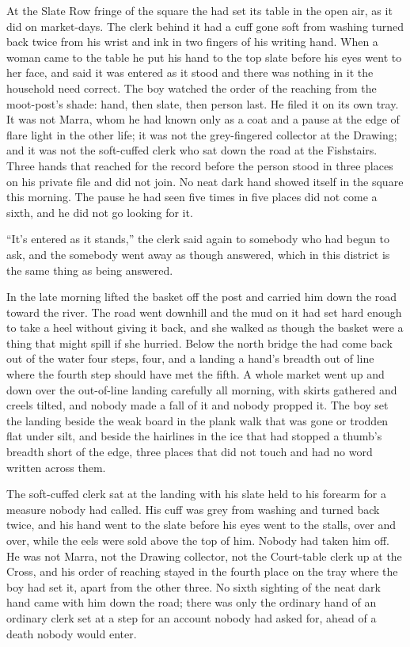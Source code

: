 At the Slate Row fringe of the square the  had set its table in the open air, as it did on market-days. The clerk behind it had a cuff gone soft from washing turned back twice from his wrist and ink in two fingers of his writing hand. When a woman came to the table he put his hand to the top slate before his eyes went to her face, and said it was entered as it stood and there was nothing in it the household need correct. The boy watched the order of the reaching from the moot-post's shade: hand, then slate, then person last. He filed it on its own tray. It was not Marra, whom he had known only as a coat and a pause at the edge of flare light in the other life; it was not the grey-fingered collector at the Drawing; and it was not the soft-cuffed clerk who sat down the road at the Fishstairs. Three hands that reached for the record before the person stood in three places on his private file and did not join. No neat dark hand showed itself in the square this morning. The pause he had seen five times in five places did not come a sixth, and he did not go looking for it.

“It's entered as it stands,” the clerk said again to somebody who had begun to ask, and the somebody went away as though answered, which in this district is the same thing as being answered.

In the late morning  lifted the basket off the post and carried him down the road toward the river. The road went downhill and the mud on it had set hard enough to take a heel without giving it back, and she walked as though the basket were a thing that might spill if she hurried. Below the north bridge the  had come back out of the water four steps, four, and a landing a hand's breadth out of line where the fourth step should have met the fifth. A whole market went up and down over the out-of-line landing carefully all morning, with skirts gathered and creels tilted, and nobody made a fall of it and nobody propped it. The boy set the landing beside the weak board in the plank walk that was gone or trodden flat under silt, and beside the hairlines in the ice that had stopped a thumb's breadth short of the edge, three places that did not touch and had no word written across them.

The soft-cuffed clerk sat at the landing with his slate held to his forearm for a measure nobody had called. His cuff was grey from washing and turned back twice, and his hand went to the slate before his eyes went to the stalls, over and over, while the eels were sold above the top of him. Nobody had taken him off. He was not Marra, not the Drawing collector, not the Court-table clerk up at the Cross, and his order of reaching stayed in the fourth place on the tray where the boy had set it, apart from the other three. No sixth sighting of the neat dark hand came with him down the road; there was only the ordinary hand of an ordinary clerk set at a step for an account nobody had asked for, ahead of a death nobody would enter.
\scenebreak


